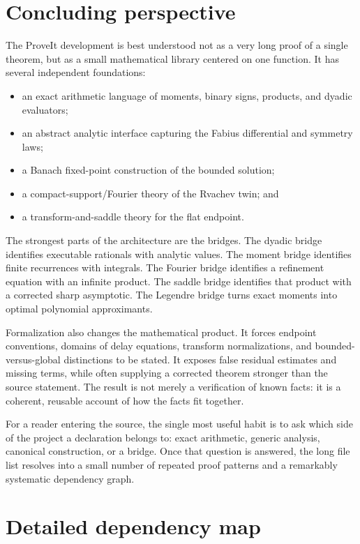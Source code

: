 \documentclass[11pt,oneside]{article}
\theoremstyle{definition}
\theoremstyle{remark}
\begin{document}
\section{Concluding perspective}
The ProveIt development is best understood not as a very long proof of a single theorem, but as a small mathematical library centered on one function.  It has several independent foundations:
\begin{itemize}
  \item an exact arithmetic language of moments, binary signs, products, and dyadic evaluators;
  \item an abstract analytic interface capturing the Fabius differential and symmetry laws;
  \item a Banach fixed-point construction of the bounded solution;
  \item a compact-support/Fourier theory of the Rvachev twin; and
  \item a transform-and-saddle theory for the flat endpoint.
\end{itemize}
The strongest parts of the architecture are the bridges.  The dyadic bridge identifies executable rationals with analytic values.  The moment bridge identifies finite recurrences with integrals.  The Fourier bridge identifies a refinement equation with an infinite product.  The saddle bridge identifies that product with a corrected sharp asymptotic.  The Legendre bridge turns exact moments into optimal polynomial approximants.

Formalization also changes the mathematical product.  It forces endpoint conventions, domains of delay equations, transform normalizations, and bounded-versus-global distinctions to be stated.  It exposes false residual estimates and missing terms, while often supplying a corrected theorem stronger than the source statement.  The result is not merely a verification of known facts: it is a coherent, reusable account of how the facts fit together.

For a reader entering the source, the single most useful habit is to ask which side of the project a declaration belongs to: exact arithmetic, generic analysis, canonical construction, or a bridge.  Once that question is answered, the long file list resolves into a small number of repeated proof patterns and a remarkably systematic dependency graph.

\appendix

\section{Detailed dependency map}\label{app:dependency}
\end{document}
